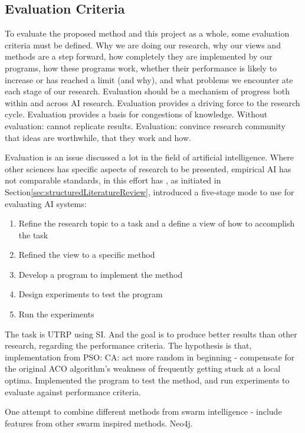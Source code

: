 \subsection{Evaluation Criteria}
\label{subsec:evaluationCriteraCohen}

To evaluate the proposed method and this project as a whole, some evaluation criteria must be defined. Why we are doing our research, why our views and methods are a step forward, how completely they are implemented by our programs, how these programs work, whether their performance is likely to increase or has reached a limit (and why), and what problems we encounter ate each stage of our research. Evaluation should be a mechanism of progress both within and across AI research. Evaluation provides a driving force to the research cycle. Evaluation provides a basis for congestions of knowledge. Without evaluation: cannot replicate results. Evaluation: convince research community that ideas are worthwhile, that they work and how. 

Evaluation is an issue discussed a lot in the field of artificial intelligence. Where other sciences has specific aspects of research to be presented, empirical AI has not comparable standards, in this effort has \citet{cohen88}, as initiated in Section\vref{sec:structuredLiteratureReview}, introduced a five-stage mode to use for evaluating AI systems: 
\begin{enumerate}
\item Refine the research topic to a task and a define a view of how to accomplish the task
\item Refined the view to a specific method
\item Develop a program to implement the method
\item Design experiments to test the program
\item Run the experiments
\end{enumerate} 
 
The task is UTRP using SI. 
And the goal is to produce better results than other research, regarding the performance criteria.  
The hypothesis is that, implementation from PSO: CA: act more random in beginning - compensate for the original ACO algorithm's weakness of frequently getting stuck at a local optima. Implemented the program to test the method, and run experiments to evaluate against performance criteria.

One attempt to combine different methods from swarm intelligence - include features from other swarm inspired methods. Neo4j.
